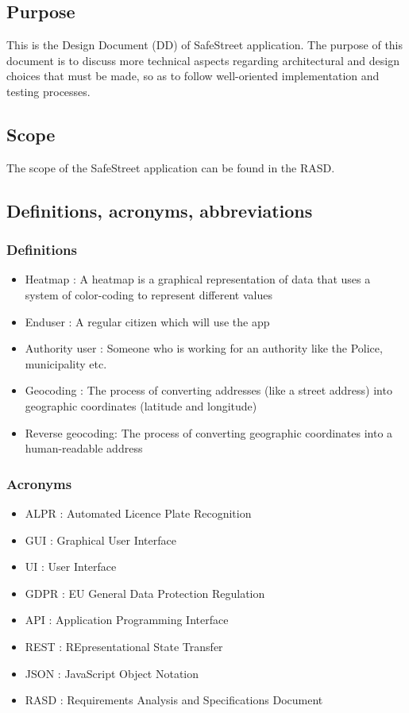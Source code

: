 \subsection{Purpose}
This is the Design Document (DD) of SafeStreet application. The purpose of this document is to discuss more technical aspects regarding architectural and design choices that must be made, so as to follow well-oriented implementation and testing processes.

\subsection{Scope}
The scope of the SafeStreet application can be found in the RASD.

\subsection{Definitions,  acronyms,  abbreviations}

\subsubsection{Definitions}
\begin{itemize}
  \item Heatmap : A heatmap is a graphical representation of data that uses a system of color-coding to represent different values
  \item Enduser : A regular citizen which will use the app
  \item Authority user : Someone who is working for an authority like the Police, municipality etc.
  \item Geocoding : The process of converting addresses (like a street address) into geographic coordinates (latitude and longitude)
  \item Reverse geocoding:  The process of converting geographic coordinates into a human-readable address

\end{itemize}

\subsubsection{Acronyms}
\begin{itemize}
  \item ALPR : Automated Licence Plate Recognition
  \item GUI : Graphical User Interface
  \item UI : User Interface
  \item GDPR : EU General Data Protection Regulation
  \item API : Application Programming Interface
  \item REST : REpresentational State Transfer
  \item JSON : JavaScript Object Notation
  \item RASD : Requirements Analysis and Specifications Document
\end{itemize}

